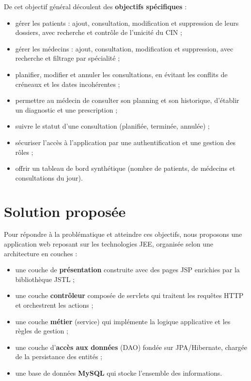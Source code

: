 De cet objectif général découlent des \textbf{objectifs spécifiques} :

\begin{itemize}
    \item gérer les patients : ajout, consultation, modification et suppression de leurs dossiers, avec recherche et contrôle de l'unicité du CIN ;
    \item gérer les médecins : ajout, consultation, modification et suppression, avec recherche et filtrage par spécialité ;
    \item planifier, modifier et annuler les consultations, en évitant les conflits de créneaux et les dates incohérentes ;
    \item permettre au médecin de consulter son planning et son historique, d'établir un diagnostic et une prescription ;
    \item suivre le statut d'une consultation (planifiée, terminée, annulée) ;
    \item sécuriser l'accès à l'application par une authentification et une gestion des rôles ;
    \item offrir un tableau de bord synthétique (nombre de patients, de médecins et consultations du jour).
\end{itemize}

\section{Solution proposée}

Pour répondre à la problématique et atteindre ces objectifs, nous proposons une application web reposant sur les technologies JEE, organisée selon une architecture en couches :

\begin{itemize}
    \item une couche de \textbf{présentation} construite avec des pages JSP enrichies par la bibliothèque JSTL ;
    \item une couche \textbf{contrôleur} composée de servlets qui traitent les requêtes HTTP et orchestrent les actions ;
    \item une couche \textbf{métier} (service) qui implémente la logique applicative et les règles de gestion ;
    \item une couche d'\textbf{accès aux données} (DAO) fondée sur JPA/Hibernate, chargée de la persistance des entités ;
    \item une base de données \textbf{MySQL} qui stocke l'ensemble des informations.
\end{itemize}

